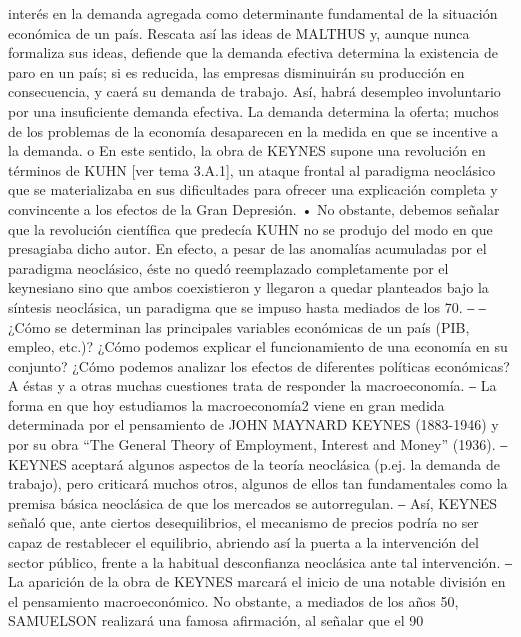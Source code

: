 \documentclass[10pt,a4paper]{article}
\begin{document}
interés en la demanda agregada como determinante fundamental de la situación económica de un país. Rescata así las ideas de MALTHUS y, aunque nunca formaliza sus ideas, defiende que la demanda efectiva determina la existencia de paro en un país; si es reducida, las empresas disminuirán su producción en consecuencia, y caerá su demanda de trabajo. Así, habrá desempleo involuntario por una insuficiente demanda efectiva. La demanda determina la oferta; muchos de los problemas de la economía desaparecen en la medida en que se incentive a la demanda. o En este sentido, la obra de KEYNES supone una revolución en términos de KUHN [ver tema 3.A.1], un ataque frontal al paradigma neoclásico que se materializaba en sus dificultades para ofrecer una explicación completa y convincente a los efectos de la Gran Depresión. • No obstante, debemos señalar que la revolución científica que predecía KUHN no se produjo del modo en que presagiaba dicho autor. En efecto, a pesar de las anomalías acumuladas por el paradigma neoclásico, éste no quedó reemplazado completamente por el keynesiano sino que ambos coexistieron y llegaron a quedar planteados bajo la síntesis neoclásica, un paradigma que se impuso hasta mediados de los 70. ‒ ‒ ¿Cómo se determinan las principales variables económicas de un país (PIB, empleo, etc.)? ¿Cómo podemos explicar el funcionamiento de una economía en su conjunto? ¿Cómo podemos analizar los efectos de diferentes políticas económicas? A éstas y a otras muchas cuestiones trata de responder la macroeconomía. ‒ La forma en que hoy estudiamos la macroeconomía2 viene en gran medida determinada por el pensamiento de JOHN MAYNARD KEYNES (1883-1946) y por su obra “The General Theory of Employment, Interest and Money” (1936). ‒ KEYNES aceptará algunos aspectos de la teoría neoclásica (p.ej. la demanda de trabajo), pero criticará muchos otros, algunos de ellos tan fundamentales como la premisa básica neoclásica de que los mercados se autorregulan. ‒ Así, KEYNES señaló que, ante ciertos desequilibrios, el mecanismo de precios podría no ser capaz de restablecer el equilibrio, abriendo así la puerta a la intervención del sector público, frente a la habitual desconfianza neoclásica ante tal intervención. ‒ La aparición de la obra de KEYNES marcará el inicio de una notable división en el pensamiento macroeconómico. No obstante, a mediados de los años 50, SAMUELSON realizará una famosa afirmación, al señalar que el 90 %
\end{document}
